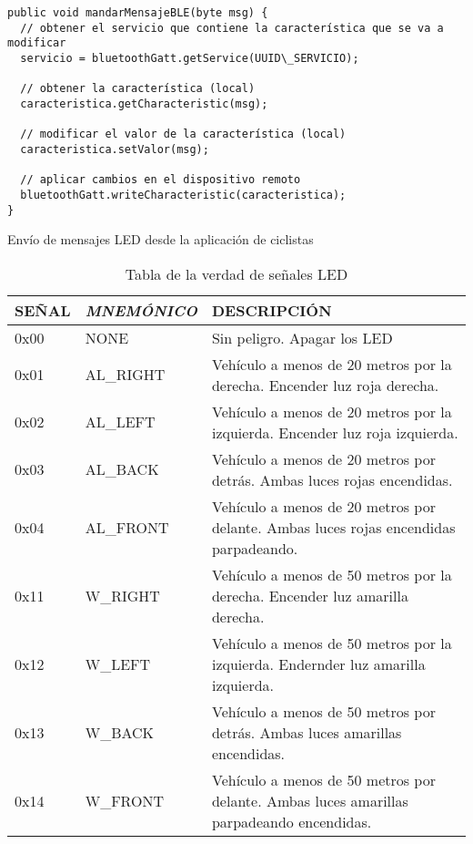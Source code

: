 \begin{description}
\begin{listing}
\begin{minipage}{.4\textwidth}
\begin{verbatim}
public void mandarMensajeBLE(byte msg) {
  // obtener el servicio que contiene la característica que se va a modificar
  servicio = bluetoothGatt.getService(UUID\_SERVICIO);	
  
  // obtener la característica (local)
  caracteristica.getCharacteristic(msg);
  
  // modificar el valor de la característica (local)
  caracteristica.setValor(msg);
  
  // aplicar cambios en el dispositivo remoto
  bluetoothGatt.writeCharacteristic(caracteristica);	
}	
				\end{verbatim}
			\end{minipage}
		\caption{Envío de mensajes LED desde la aplicación de ciclistas}\label{alg:appciclistasBLE}
	\end{listing}
\end{description}

\begin{table}[H]
	\centering
	\caption{Tabla de la verdad de señales LED}\label{tab:tablaVerdadLED}
	\begin{tabular}{lll}
		\toprule
		\textbf{SEÑAL} & \emph{MNEMÓNICO} & DESCRIPCIÓN \\
		\midrule
		
		0x00    & NONE    & Sin peligro. Apagar los LED \\
		0x01    & AL\_RIGHT & Vehículo a menos de 20 metros por la derecha. Encender luz roja derecha. \\
		0x02    & AL\_LEFT & Vehículo a menos de 20 metros por la izquierda. Encender luz roja izquierda. \\
		0x03    & AL\_BACK & Vehículo a menos de 20 metros por detrás. Ambas luces rojas encendidas. \\
		0x04    & AL\_FRONT & Vehículo a menos de 20 metros por delante. Ambas luces rojas encendidas parpadeando. \\
		0x11    & W\_RIGHT & Vehículo a menos de 50 metros por la derecha. Encender luz amarilla derecha. \\
		0x12    & W\_LEFT & Vehículo a menos de 50 metros por la izquierda. Endernder luz amarilla izquierda. \\
		0x13    & W\_BACK & Vehículo a menos de 50 metros por detrás. Ambas luces amarillas encendidas. \\
		0x14    & W\_FRONT & Vehículo a menos de 50 metros por delante. Ambas luces amarillas parpadeando encendidas.\\
		\bottomrule
	\end{tabular}
\end{table}
